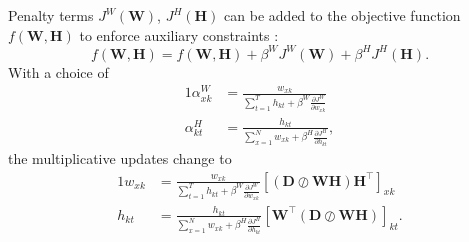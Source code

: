 Penalty terms $J^{W}(\bm{W})$, $J^{H}(\bm{H})$ can be added to the objective function $f(\bm{W,H})$ to enforce auxiliary constraints \cite{Berry2007}:
%
\begin{equation}
	f(\bm{W,H})=f(\bm{W,H})+\beta^{W}J^{W}(\bm{W})+\beta^{H}J^{H}(\bm{H}).
	\label{eq:objective + auxiliary}
\end{equation}
%
With a choice of
%
\begin{alignat}{1}
	\alpha_{xk}^{W} & =\frac{w_{xk}}{\sum_{t=1}^Th_{kt}+\beta^{W}\frac{\partial J^{W}}{\partial w_{xk}}}\nonumber \\
	\alpha_{kt}^{H} & =\frac{h_{kt}}{\sum_{x=1}^Nw_{xk}+\beta^{H}\frac{\partial J^{H}}{\partial h_{kt}}},
	\label{alphas + auxiliary}
\end{alignat}
%
the multiplicative updates change to
%
\begin{alignat}{1}
	w_{xk} & =\frac{w_{xk}}{\sum_{t=1}^Th_{kt}+\beta^{W}\frac{\partial J^{W}}{\partial w_{xk}}}\left[(\bm{D}\oslash\bm{WH})\bm{H^{\top}}\right]_{xk}\nonumber \\
	h_{kt} & =\frac{h_{kt}}{\sum_{x=1}^Nw_{xk}+\beta^{H}\frac{\partial J^{H}}{\partial h_{kt}}}\left[\bm{W^{\top}}(\bm{D}\oslash\bm{WH})\right]_{kt}.
	\label{eq:classic updates + auxiliary}
\end{alignat}